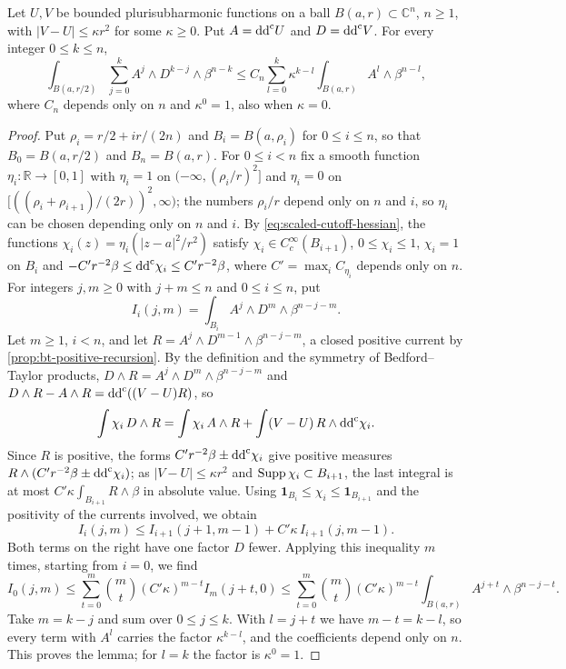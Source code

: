 \begin{lemma}\label{lem:nearby-bounded-psh-traces}
Let $U,V$ be bounded plurisubharmonic functions on a ball $B(a,r)\subset\mathbb C^n$, $n\geq1$, with $|V-U|\leq\kappa r^2$ for some $\kappa\geq0$. Put $A=\mathrm{dd}^{\mathrm{c}} U$ and $D=\mathrm{dd}^{\mathrm{c}} V$. For every integer $0\leq k\leq n$,
\[
 \int_{B(a,r/2)}\sum_{j=0}^k A^j\wedge D^{k-j}\wedge\beta^{n-k}
 \leq C_n\sum_{l=0}^k \kappa^{k-l}
                         \int_{B(a,r)}A^l\wedge\beta^{n-l},
\]
where $C_n$ depends only on $n$ and $\kappa^0=1$, also when $\kappa=0$.
\end{lemma}
\begin{proof}
Put $\rho_i=r/2+ir/(2n)$ and $B_i=B(a,\rho_i)$ for $0\leq i\leq n$, so that $B_0=B(a,r/2)$ and $B_n=B(a,r)$. For $0\leq i<n$ fix a smooth function $\eta_i\colon\mathbb R\to[0,1]$ with $\eta_i=1$ on $(-\infty,(\rho_i/r)^2]$ and $\eta_i=0$ on $[((\rho_i+\rho_{i+1})/(2r))^2,\infty)$; the numbers $\rho_i/r$ depend only on $n$ and $i$, so $\eta_i$ can be chosen depending only on $n$ and $i$. By \eqref{eq:scaled-cutoff-hessian}, the functions $\chi_i(z)=\eta_i(|z-a|^2/r^2)$ satisfy $\chi_i\in C^\infty_c(B_{i+1})$, $0\leq\chi_i\leq1$, $\chi_i=1$ on $B_i$ and $-C'r^{-2}\beta\leq\mathrm{dd}^{\mathrm{c}}\chi_i\leq C'r^{-2}\beta$, where $C'=\max_iC_{\eta_i}$ depends only on $n$. For integers $j,m\geq0$ with $j+m\leq n$ and $0\leq i\leq n$, put
\[
 I_i(j,m)=\int_{B_i}A^j\wedge D^m\wedge\beta^{n-j-m}.
\]
Let $m\geq1$, $i<n$, and let $R=A^j\wedge D^{m-1}\wedge\beta^{n-j-m}$, a closed positive current by \cref{prop:bt-positive-recursion}. By the definition and the symmetry of Bedford--Taylor products, $D\wedge R=A^j\wedge D^m\wedge\beta^{n-j-m}$ and $D\wedge R-A\wedge R=\mathrm{dd}^{\mathrm{c}}((V-U)R)$, so
\[
 \int\chi_i\,D\wedge R=\int\chi_i\,A\wedge R+\int(V-U)\,R\wedge\mathrm{dd}^{\mathrm{c}}\chi_i.
\]
Since $R$ is positive, the forms $C'r^{-2}\beta\pm\mathrm{dd}^{\mathrm{c}}\chi_i$ give positive measures $R\wedge(C'r^{-2}\beta\pm\mathrm{dd}^{\mathrm{c}}\chi_i)$; as $|V-U|\leq\kappa r^2$ and $\operatorname{Supp}\chi_i\subset B_{i+1}$, the last integral is at most $C'\kappa\int_{B_{i+1}}R\wedge\beta$ in absolute value. Using $\mathbf1_{B_i}\leq\chi_i\leq\mathbf1_{B_{i+1}}$ and the positivity of the currents involved, we obtain
\[
 I_i(j,m)\leq I_{i+1}(j+1,m-1)+C'\kappa\,I_{i+1}(j,m-1).
\]
Both terms on the right have one factor $D$ fewer. Applying this inequality $m$ times, starting from $i=0$, we find
\[
 I_0(j,m)\leq\sum_{t=0}^m\binom mt(C'\kappa)^{m-t}I_m(j+t,0)
 \leq\sum_{t=0}^m\binom mt(C'\kappa)^{m-t}\int_{B(a,r)}A^{j+t}\wedge\beta^{n-j-t}.
\]
Take $m=k-j$ and sum over $0\leq j\leq k$. With $l=j+t$ we have $m-t=k-l$, so every term with $A^l$ carries the factor $\kappa^{k-l}$, and the coefficients depend only on $n$. This proves the lemma; for $l=k$ the factor is $\kappa^0=1$.
\end{proof}

